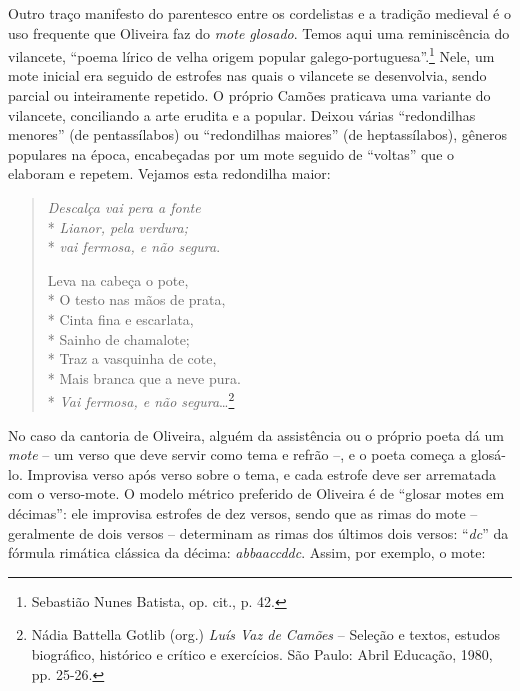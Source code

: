 \asterisc

Outro traço manifesto do parentesco entre os cordelistas
e a tradição medieval é o uso frequente que Oliveira faz do
\textit{mote glosado}. Temos aqui uma reminiscência do vilancete,
``poema lírico de velha origem popular 
galego-portuguesa''.\footnote{ Sebastião Nunes Batista, op. cit.,
p. 42.} Nele, um mote inicial era seguido de estrofes
nas quais o vilancete se desenvolvia, sendo parcial ou
inteiramente repetido. O próprio Camões praticava uma
variante do vilancete, conciliando a arte erudita e a popular.
Deixou várias ``redondilhas menores'' (de
pentassílabos) ou ``redondilhas maiores'' (de
heptassílabos), gêneros populares na época, encabeçadas por um mote seguido de
``voltas'' que o elaboram e repetem. Vejamos esta
redondilha maior:

\begin{verse}

\textit{Descalça vai pera a fonte}\\*
\textit{Lianor, pela verdura;}\\*
\textit{vai fermosa, e não segura}.

Leva na cabeça o pote,\\*
O testo nas mãos de prata,\\*
Cinta fina e escarlata,\\*
Sainho de chamalote;\\*
Traz a vasquinha de cote,\\*
Mais branca que a neve pura.\\*
\textit{Vai fermosa, e não segura}\ldots\footnote{ Nádia Battella Gotlib (org.) \textit{Luís Vaz de Camões} -- Seleção e textos, estudos biográfico, histórico e crítico e
exercícios. São Paulo: Abril Educação, 1980, pp. 25-26.}

\end{verse}

No caso da cantoria de Oliveira, alguém da assistência
ou o próprio poeta dá um \textit{mote} -- um verso que deve
servir como tema e refrão --, e o poeta começa a glosá-
lo. Improvisa verso após verso sobre o tema, e cada estrofe
deve ser arrematada com o verso-mote. O modelo métrico
preferido de Oliveira é de ``glosar motes em
décimas'':
ele improvisa estrofes de dez versos, sendo que as rimas
do mote -- geralmente de dois versos -- determinam as
rimas dos últimos dois versos: ``\textit{dc}'' da
fórmula rimática clássica da décima: \textit{abbaaccddc}. Assim, por exemplo, o
mote:

